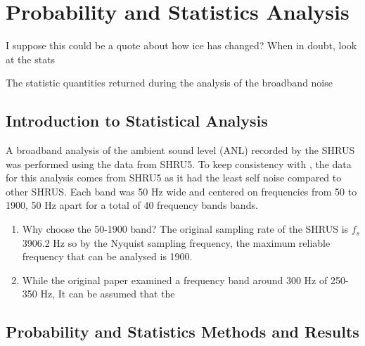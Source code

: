 
\chapter{Probability and Statistics Analysis}

\begin{center}
  \begin{minipage}{0.5\textwidth}
    \begin{small}
       I suppose this could be a quote about how ice has changed? When in doubt, look at the stats
    \end{small}
  \end{minipage}
  \vspace{0.5cm}
\end{center}

\noindent The statistic quantities returned during the analysis of the broadband noise 

\section{Introduction to Statistical Analysis}

A broadband analysis of the ambient sound level (ANL) recorded by the SHRUS was performed using the data from SHRU5. To keep consistency with \cite{BonnelMain}, the data for this analysis comes from SHRU5 as it had the least self noise compared to other SHRUS. Each band was 50 Hz wide and centered on frequencies from 50 to 1900, 50 Hz apart for a total of 40 frequency bands bands. 
\begin{enumerate}
\item  Why choose the 50-1900 band? The original sampling rate of the SHRUS is $f_{s}$ 3906.2 Hz so by the Nyquist sampling frequency, the maximum reliable frequency that can be analysed is 1900.
\item While the original paper examined a frequency band around 300 Hz of 250-350 Hz, It can be assumed that the
\end{enumerate}



\section{Probability and Statistics Methods and Results}
